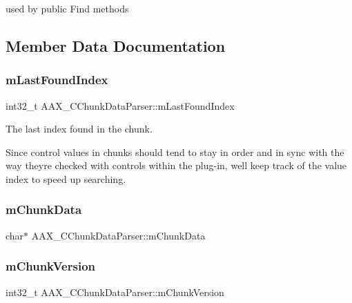 used by public Find methods 



\subsection{Member Data Documentation}
\mbox{\label{a01461_a3e08508e7f92c6e43dd2de6a38868e2f}} 
\subsubsection{\texorpdfstring{mLastFoundIndex}{mLastFoundIndex}}
{\footnotesize\ttfamily int32\+\_\+t A\+A\+X\+\_\+\+C\+Chunk\+Data\+Parser\+::m\+Last\+Found\+Index\hspace{0.3cm}{\ttfamily [protected]}}



The last index found in the chunk. 

Since control values in chunks should tend to stay in order and in sync with the way they\textquotesingle{}re checked with controls within the plug-\/in, we\textquotesingle{}ll keep track of the value index to speed up searching. \mbox{\label{a01461_a67054cdc2d8e55ff2c26947930784bc9}} 
\subsubsection{\texorpdfstring{mChunkData}{mChunkData}}
{\footnotesize\ttfamily char$\ast$ A\+A\+X\+\_\+\+C\+Chunk\+Data\+Parser\+::m\+Chunk\+Data\hspace{0.3cm}{\ttfamily [protected]}}

\mbox{\label{a01461_a5994e0adfb0189cbf5f9a3aa915b3f7d}} 
\subsubsection{\texorpdfstring{mChunkVersion}{mChunkVersion}}
{\footnotesize\ttfamily int32\+\_\+t A\+A\+X\+\_\+\+C\+Chunk\+Data\+Parser\+::m\+Chunk\+Version\hspace{0.3cm}{\ttfamily [protected]}}



